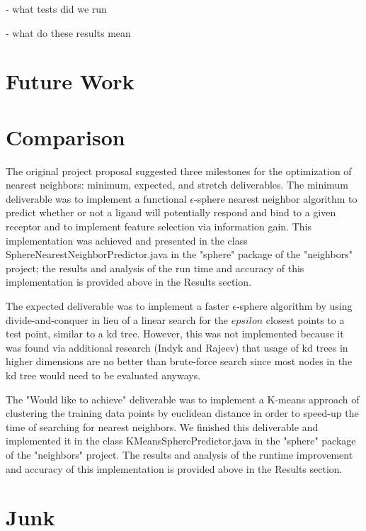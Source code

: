 \documentclass[11pt,letterpaper]{article}
\begin{document}
- what tests did we run

- what do these results mean

\section{Future Work}


\section{Comparison}

The original project proposal suggested three milestones for the optimization of nearest neighbors: minimum, expected, and stretch deliverables. The minimum deliverable was to implement a functional $\epsilon$-sphere nearest neighbor algorithm to predict whether or not a ligand will potentially respond and bind to a given receptor and to implement feature selection via information gain. This implementation was achieved and presented in the class SphereNearestNeighborPredictor.java in the "sphere" package of the "neighbors" project; the results and analysis of the run time and accuracy of this implementation is provided above in the Results section.

The expected deliverable was to implement a faster $\epsilon$-sphere algorithm by using divide-and-conquer in lieu of a linear search for the $epsilon$ closest points to a test point, similar to a kd tree. However, this was not implemented because it was found via additional research (Indyk and Rajeev) that usage of kd trees in higher dimensions are no better than brute-force search since most nodes in the kd tree would need to be evaluated anyways.

The "Would like to achieve" deliverable was to implement a K-means approach of clustering the training data points by euclidean distance in order to speed-up the time of searching for nearest neighbors.  We finished this deliverable and implemented it in the class KMeansSpherePredictor.java in the "sphere" package of the "neighbors" project. The results and analysis of the runtime improvement and accuracy of this implementation is provided above in the Results section.


\section{Junk}
\end{document}
